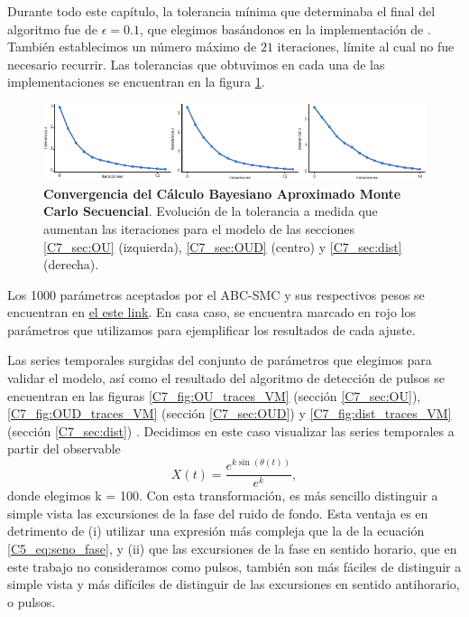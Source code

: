 \documentclass[./main.tex]{subfiles}
\begin{document}
\begin{subappendices}
Durante todo este capítulo, la tolerancia mínima que determinaba el final del algoritmo fue de $\epsilon = 0.1$, que elegimos basándonos en la implementación de \cite{Costa2021}. También establecimos un número máximo de $21$ iteraciones, límite al cual no fue necesario recurrir. Las tolerancias que obtuvimos en cada una de las implementaciones se encuentran en la figura 
\ref{C7_fig:ap_eps}.

\begin{figure}
    \centering
    \includegraphics[width=1\columnwidth]{figures/chapter7/C7_eps.pdf} 
    \caption{\textbf{Convergencia del Cálculo Bayesiano Aproximado Monte Carlo Secuencial}. Evolución de la tolerancia a medida que aumentan las iteraciones para el modelo de las secciones \ref{C7_sec:OU} (izquierda),  \ref{C7_sec:OUD} (centro) y  \ref{C7_sec:dist} (derecha).}
    \label{C7_fig:ap_eps}
\end{figure} 


Los 1000 parámetros aceptados por el ABC-SMC y sus respectivos pesos se encuentran en \href{https://github.com/fiorefabris/parameters}{el este \underline{link}}. En casa caso, se encuentra marcado en rojo los parámetros que utilizamos para ejemplificar los resultados de cada ajuste. 


Las series temporales surgidas del conjunto de parámetros que elegimos para validar el modelo, así como el resultado del algoritmo de detección de pulsos se encuentran en las figuras \ref{C7_fig:OU_traces_VM} (sección \ref{C7_sec:OU}), \ref{C7_fig:OUD_traces_VM} (sección \ref{C7_sec:OUD}) y \ref{C7_fig:dist_traces_VM} (sección \ref{C7_sec:dist}) . Decidimos en este caso visualizar las series temporales a partir del observable 
\begin{equation}
    X(t) = \frac{e^{k\sin{(\theta(t))}}}{e^{k}},
    \label{C7_eq:VM}
\end{equation}
donde elegimos k = 100. Con esta transformación, es más sencillo distinguir a simple vista las excursiones de la fase del ruido de fondo. Esta ventaja es en detrimento de (i) utilizar una expresión más compleja que la de la ecuación \ref{C5_eq:seno_fase}, y (ii) que las excursiones de la fase en sentido horario, que en este trabajo no consideramos como pulsos, también son más fáciles de distinguir a simple vista y más difíciles de distinguir de las excursiones en sentido antihorario, o pulsos. 



\end{subappendices}
\end{document}
